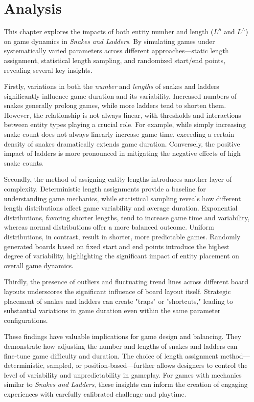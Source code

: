 \section{Analysis}

This chapter explores the impacts of both entity number and length ($L^S$ and $L^L$) on game dynamics in \textit{Snakes and Ladders}. By simulating games under systematically varied parameters across different approaches—static length assignment, statistical length sampling, and randomized start/end points, revealing several key insights.

Firstly, variations in both the \textit{number} and \textit{lengths} of snakes and ladders significantly influence game duration and its variability. Increased numbers of snakes generally prolong games, while more ladders tend to shorten them. However, the relationship is not always linear, with thresholds and interactions between entity types playing a crucial role. For example, while simply increasing snake count does not always linearly increase game time, exceeding a certain density of snakes dramatically extends game duration. Conversely, the positive impact of ladders is more pronounced in mitigating the negative effects of high snake counts.

Secondly, the method of assigning entity lengths introduces another layer of complexity. Deterministic length assignments provide a baseline for understanding game mechanics, while statistical sampling reveals how different length distributions affect game variability and average duration. Exponential distributions, favoring shorter lengths, tend to increase game time and variability, whereas normal distributions offer a more balanced outcome. Uniform distributions, in contrast, result in shorter, more predictable games. Randomly generated boards based on fixed start and end points introduce the highest degree of variability, highlighting the significant impact of entity placement on overall game dynamics.

Thirdly, the presence of outliers and fluctuating trend lines across different board layouts underscores the significant influence of board layout itself. Strategic placement of snakes and ladders can create "traps" or "shortcuts," leading to substantial variations in game duration even within the same parameter configurations.

These findings have valuable implications for game design and balancing. They demonstrate how adjusting the number and lengths of snakes and ladders can fine-tune game difficulty and duration. The choice of length assignment method—deterministic, sampled, or position-based—further allows designers to control the level of variability and unpredictability in gameplay. For games with mechanics similar to \textit{Snakes and Ladders}, these insights can inform the creation of engaging experiences with carefully calibrated challenge and playtime.

